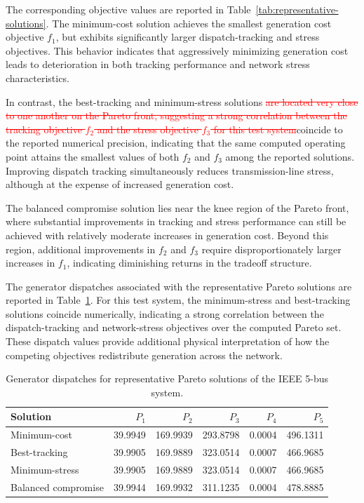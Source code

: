 \documentclass[11pt,pdflatex,sn-mathphys-ay]{sn-jnl}%
\theoremstyle{definition}
\theoremstyle{thmstyleone}%
\theoremstyle{thmstyletwo}%
\theoremstyle{thmstylethree}%
\newcommand{\del}[1]{\textcolor{red}{\sout{#1}}}
\newcommand{\add}[1]{\textcolor{revisionblue}{#1}}
\begin{document}
	The corresponding objective values are reported in Table~\ref{tab:representative-solutions}. 
	The minimum-cost solution achieves the smallest generation cost objective \(f_1\), but exhibits significantly larger dispatch-tracking and stress objectives. This behavior indicates that aggressively minimizing generation cost leads to deterioration in both tracking performance and network stress characteristics.
	
	In contrast, the best-tracking and minimum-stress solutions \del{are located very close to one another on the Pareto front, suggesting a strong correlation between the tracking objective \(f_2\) and the stress objective \(f_3\) for this test system}\add{coincide to the
		reported numerical precision, indicating that the same computed operating point attains the smallest values of both
		$f_2$ and $f_3$ among the reported solutions}. Improving dispatch tracking simultaneously reduces transmission-line stress, although at the expense of increased generation cost.
	
	The balanced compromise solution lies near the knee region of the Pareto front, where substantial improvements in tracking and stress performance can still be achieved with relatively moderate increases in generation cost. Beyond this region, additional improvements in \(f_2\) and \(f_3\) require disproportionately larger increases in \(f_1\), indicating diminishing returns in the tradeoff structure.
	
	The generator dispatches associated with the representative Pareto solutions are reported in Table~\ref{tab:dispatches}. For this test system, the minimum-stress and best-tracking solutions coincide numerically, indicating a strong correlation between the dispatch-tracking and network-stress objectives over the computed Pareto set. These dispatch values provide additional physical interpretation of how the competing objectives redistribute generation across the network.
	
	\begin{table}[htbp]
		\centering
		\caption{Generator dispatches for representative Pareto solutions of the IEEE 5-bus system.}
		\label{tab:dispatches}
		\begin{tabular}{lrrrrr}
			\toprule
			Solution & $P_1$ & $P_2$ & $P_3$ & $P_4$ & $P_5$ \\
			\midrule
			Minimum-cost & 39.9949 & 169.9939 & 293.8798 & 0.0004 & 496.1311 \\
			Best-tracking & 39.9905 & 169.9889 & 323.0514 & 0.0007 & 466.9685 \\
			Minimum-stress & 39.9905 & 169.9889 & 323.0514 & 0.0007 & 466.9685 \\
			Balanced compromise & 39.9944 & 169.9932 & 311.1235 & 0.0004 & 478.8885 \\
			\bottomrule
		\end{tabular}
	\end{table}
	
\end{document}
